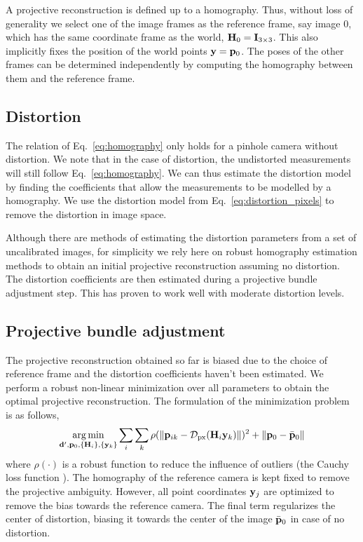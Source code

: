 \documentclass[10pt,twocolumn,letterpaper]{article}
\begin{document}
A projective reconstruction is defined up to a homography. Thus, without loss of generality we select one of the image frames as the reference frame, say image $0$, which has the same coordinate frame as the world, \ie $\mathbf{H}_0 = \mathbf{I}_{3 \times 3}$. This also implicitly fixes the position of the world points $\mathbf{y}=\mathbf{p}_0$. The poses of the other frames can be determined independently by computing the homography between them and the reference frame.

\subsection{Distortion}
\label{sec:planar:distortion}

The relation of Eq.~\eqref{eq:homography} only holds for a pinhole camera without distortion. We note that in the case of distortion, the undistorted measurements will still follow Eq.~\eqref{eq:homography}. We can thus estimate the distortion model by finding the coefficients that allow the measurements to be modelled by a homography. We use the distortion model from Eq.~\eqref{eq:distortion_pixels} to remove the distortion in image space.

Although there are methods of estimating the distortion parameters from a set of uncalibrated images, for simplicity we rely here on robust homography estimation methods \cite{hartley2003} to obtain an initial projective reconstruction assuming no distortion. The distortion coefficients are then estimated during a projective bundle adjustment step. This has proven to work well with moderate distortion levels.

\subsection{Projective bundle adjustment}
\label{sec:projective:ba}

The projective reconstruction obtained so far is biased due to the choice of reference frame and the distortion coefficients haven't been estimated. We perform a robust non-linear minimization \cite{ceres-solver} over all parameters to obtain the optimal projective reconstruction. The formulation of the minimization problem is as follows, 
%
\begin{align}
\argmin_{\dv',\pv_0,\lbrace \Hm_i \rbrace, \lbrace \yv_k \rbrace} 
%
\sum_i \sum_k \rho(\norm{\pv_{ik} - \Distortion_{\text{px}}(\Hm_i \yv_k)})^2 + \norm{\pv_0 - \bar{\pv}_0}
\end{align}
%
where $\rho(\cdot)$ is a robust function to reduce the influence of outliers (\eg the Cauchy loss function \cite{ceres-solver}). The homography of the reference camera is kept fixed to remove the projective ambiguity. However, all point coordinates $\mathbf{y}_j$ are optimized to remove the bias towards the reference camera. The final term regularizes the center of distortion, biasing it towards the center of the image $\bar{\mathbf{p}}_0$ in case of no distortion.
\end{document}
